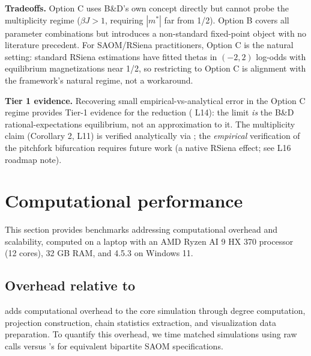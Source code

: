 \documentclass[
  article]{jss}
\begin{document}
\textbf{Tradeoffs.} Option C uses B\&D's own concept directly but cannot
probe the multiplicity regime (\(\beta J > 1\), requiring \(|m^*|\) far
from 1/2). Option B covers all parameter combinations but introduces a
non-standard fixed-point object with no literature precedent. For
SAOM/RSiena practitioners, Option C is the natural setting: standard
RSiena estimations have fitted thetas in \((-2, 2)\) log-odds with
equilibrium magnetizations near 1/2, so restricting to Option C is
alignment with the framework's natural regime, not a workaround.

\textbf{Tier 1 evidence.} Recovering small empirical-vs-analytical error
in the Option C regime provides Tier-1 evidence for the reduction
( L14): the limit \emph{is} the B\&D
rational-expectations equilibrium, not an approximation to it. The
multiplicity claim (Corollary 2, L11) is verified analytically via
; the \emph{empirical} verification of
the pitchfork bifurcation requires future work (a native
 RSiena effect; see L16 roadmap note).

\section{Computational performance}\label{sec:performance}

This section provides benchmarks addressing computational overhead and
scalability, computed on a laptop with an AMD Ryzen AI 9 HX 370
processor (12 cores), 32 GB RAM, and  4.5.3 on Windows 11.

\subsection[Overhead relative to RSiena]{Overhead relative to }

 adds computational overhead to the core 
simulation through degree computation, projection construction, chain
statistics extraction, and visualization data preparation. To quantify
this overhead, we time matched simulations using raw  calls
versus 's  for equivalent bipartite
SAOM specifications.
\end{document}
